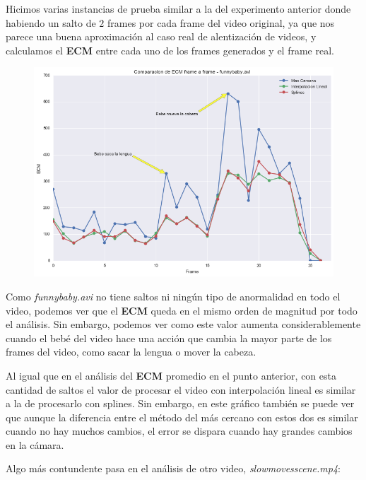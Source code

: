 Hicimos varias instancias de prueba similar a la del experimento anterior donde
habiendo un salto de \(2\) frames por cada frame del video original, ya que nos
parece una buena aproximaci\'on al caso real de alentizaci\'on de videos, y
calculamos el \textbf{ECM} entre cada uno de los frames generados y el frame
real.

\begin{figure}[H]
\centering
\includegraphics[width=.95\textwidth]{graficos/ecm_frame_funnybaby.png}
\end{figure}

Como \textit{funnybaby.avi} no tiene saltos ni ning\'un tipo de anormalidad en
todo el video, podemos ver que el \textbf{ECM} queda en el mismo orden de
magnitud por todo el an\'alisis. Sin embargo, podemos ver como este valor
aumenta considerablemente cuando el beb\'e del video hace una acci\'on que
cambia la mayor parte de los frames del video, como sacar la lengua o mover la
cabeza.

Al igual que en el an\'alisis del \textbf{ECM} promedio en el punto anterior,
con esta cantidad de saltos el valor de procesar el video con interpolaci\'on
lineal es similar a la de procesarlo con splines. Sin embargo, en este gr\'afico
tambi\'en se puede ver que aunque la diferencia entre el m\'etodo del m\'as
cercano con estos dos es similar cuando no hay muchos cambios, el error se
dispara cuando hay grandes cambios en la c\'amara.

Algo m\'as contundente pasa en el an\'alisis de otro video,
\textit{slowmovesscene.mp4}:

